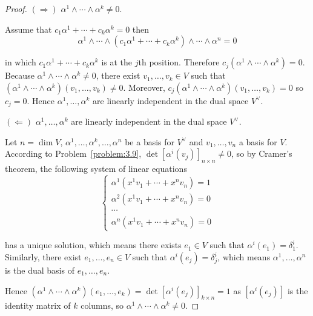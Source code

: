 \begin{proof}
    \( (\Longrightarrow) \) \( \alpha^{1} \land \cdots \land \alpha^{k} \neq 0 \).

    Assume that \( c_{1}\alpha^{1} + \cdots + c_{k}\alpha^{k} = 0 \) then
    \[
        \alpha^{1} \wedge \cdots \wedge (c_{1}\alpha^{1} + \cdots + c_{k}\alpha^{k}) \wedge \cdots \wedge \alpha^{n} = 0
    \]

    in which \( c_{1}\alpha^{1} + \cdots + c_{k}\alpha^{k} \) is at the \( j \)th position. Therefore \( c_{j} (\alpha^{1} \wedge \cdots \wedge \alpha^{k}) = 0 \). Because \( \alpha^{1} \wedge \cdots \wedge \alpha^{k} \ne 0 \), there exist \( v_{1}, \ldots, v_{k} \in V \) such that \( (\alpha^{1} \wedge \cdots \wedge \alpha^{k})(v_{1}, \ldots, v_{k}) \ne 0 \). Moreover, \( c_{j}(\alpha^{1} \wedge \cdots \wedge \alpha^{k})(v_{1}, \ldots, v_{k}) = 0 \) so \( c_{j} = 0 \). Hence \( \alpha^{1}, \ldots, \alpha^{k} \) are linearly independent in the dual space \( V^{\vee} \).

    \( (\Longleftarrow) \) \( \alpha^{1}, \ldots, \alpha^{k} \) are linearly independent in the dual space \( V^{\vee} \).

    Let \( n = \dim V \), \( \alpha^{1}, \ldots, \alpha^{k}, \ldots, \alpha^{n} \) be a basis for \( V^{\vee} \) and \( v_{1}, \ldots, v_{n} \) a basis for \( V \). According to Problem~\ref{problem:3.9}, \( \det{[\alpha^{i}(v_{j})]}_{n\times n} \ne 0 \), so by Cramer's theorem, the following system of linear equations
    \[
        \begin{cases}
            \alpha^{1}(x^{1}v_{1} + \cdots + x^{n}v_{n}) = 1 \\
            \alpha^{2}(x^{1}v_{1} + \cdots + x^{n}v_{n}) = 0 \\
            \cdots                                           \\
            \alpha^{n}(x^{1}v_{1} + \cdots + x^{n}v_{n}) = 0
        \end{cases}
    \]

    has a unique solution, which means there exists \( e_{1} \in V \) such that \( \alpha^{i}(e_{1}) = \delta^{i}_{1} \). Similarly, there exist \( e_{1}, \ldots, e_{n} \in V \) such that \( \alpha^{i}(e_{j}) = \delta^{i}_{j} \), which means \( \alpha^{1}, \ldots, \alpha^{n} \) is the dual basis of \( e_{1}, \ldots, e_{n} \).

    Hence \( (\alpha^{1} \wedge \cdots \wedge \alpha^{k})(e_{1}, \ldots, e_{k}) = \det{[\alpha^{i}(e_{j})]}_{k\times n} = 1 \) as \( [\alpha^{i}(e_{j})] \) is the identity matrix of \( k \) columns, so \( \alpha^{1} \wedge \cdots \wedge \alpha^{k} \ne 0 \).
\end{proof}

